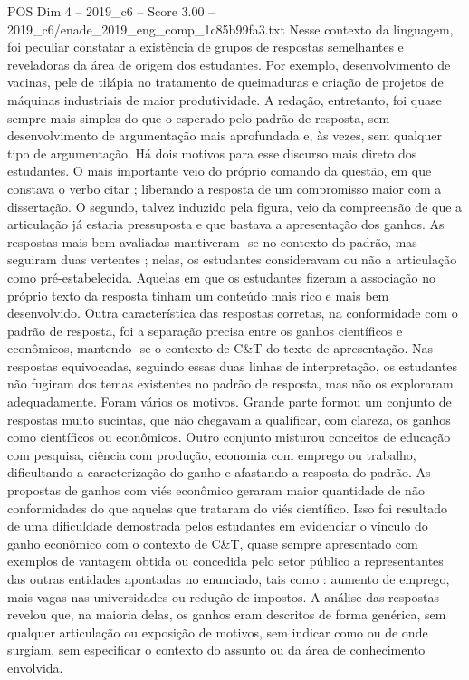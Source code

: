 \begin{textsample}{POS Dim 4 – 2019\_c6 – Score 3.00 – 2019\_c6/enade\_2019\_eng\_comp\_1c85b99fa3.txt}
Nesse contexto da linguagem, foi peculiar constatar a existência de grupos de respostas semelhantes e reveladoras da área de origem dos estudantes.
Por exemplo, desenvolvimento de vacinas, pele de tilápia no tratamento de queimaduras e criação de projetos de máquinas industriais de maior produtividade.
A redação, entretanto, foi quase sempre mais simples do que o esperado pelo padrão de resposta, sem desenvolvimento de argumentação mais aprofundada e, às vezes, sem qualquer tipo de argumentação.
Há dois motivos para esse discurso mais direto dos estudantes.
O mais importante veio do próprio comando da questão, em que constava o verbo citar ; liberando a resposta de um compromisso maior com a dissertação.
O segundo, talvez induzido pela figura, veio da compreensão de que a articulação já estaria pressuposta e que bastava a apresentação dos ganhos.
As respostas mais bem avaliadas mantiveram -se no contexto do padrão, mas seguiram duas vertentes ; nelas, os estudantes consideravam ou não a articulação como pré-estabelecida.
Aquelas em que os estudantes fizeram a associação no próprio texto da resposta tinham um conteúdo mais rico e mais bem desenvolvido.
Outra característica das respostas corretas, na conformidade com o padrão de resposta, foi a separação precisa entre os ganhos científicos e econômicos, mantendo -se o contexto de C\&T do texto de apresentação.
Nas respostas equivocadas, seguindo essas duas linhas de interpretação, os estudantes não fugiram dos temas existentes no padrão de resposta, mas não os exploraram adequadamente.
Foram vários os motivos.
Grande parte formou um conjunto de respostas muito sucintas, que não chegavam a qualificar, com clareza, os ganhos como científicos ou econômicos.
Outro conjunto misturou conceitos de educação com pesquisa, ciência com produção, economia com emprego ou trabalho, dificultando a caracterização do ganho e afastando a resposta do padrão.
As propostas de ganhos com viés econômico geraram maior quantidade de não conformidades do que aquelas que trataram do viés científico.
Isso foi resultado de uma dificuldade demostrada pelos estudantes em evidenciar o vínculo do ganho econômico com o contexto de C\&T, quase sempre apresentado com exemplos de vantagem obtida ou concedida pelo setor público a representantes das outras entidades apontadas no enunciado, tais como : aumento de emprego, mais vagas nas universidades ou redução de impostos.
A análise das respostas revelou que, na maioria delas, os ganhos eram descritos de forma genérica, sem qualquer articulação ou exposição de motivos, sem indicar como ou de onde surgiam, sem especificar o contexto do assunto ou da área de conhecimento envolvida.

\end{textsample}
